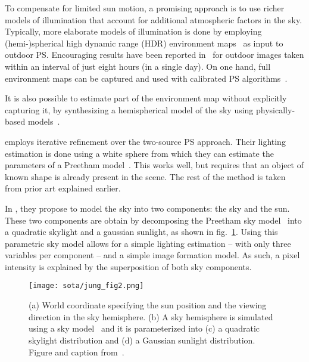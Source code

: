 To compensate for limited sun motion, a promising approach is to use richer models of illumination that account for additional atmospheric factors in the sky. Typically, more elaborate models of illumination is done by employing (hemi-)spherical high dynamic range (HDR) environment maps~\cite{debevec-siggraph-98,reinhard-book-05} as input to outdoor PS. Encouraging results have been reported in~\cite{yu-iccp-13} for outdoor images taken within an interval of just eight hours (in a single day). On one hand, full environment maps can be captured and used with calibrated PS algorithms~\cite{yu-iccp-13,shi-3dv-14,hung-wacv-15}.


It is also possible to estimate part of the environment map without explicitly capturing it, by synthesizing a hemispherical model of the sky using physically-based models~\cite{inose-tcva-13,jung-cvpr-15}.

\cite{inose-tcva-13} employs iterative refinement over the two-source PS approach. Their lighting estimation is done using a white sphere from which they can estimate the parameters of a Preetham model~\cite{preetham-siggraph-99}. This works well, but requires that an object of known shape is already present in the scene. The rest of the method is taken from prior art explained earlier.

In \cite{jung-cvpr-15}, they propose to model the sky into two components: the sky and the sun. These two components are obtain by decomposing the Preetham sky model~\cite{preetham-siggraph-99} into a quadratic skylight and a gaussian sunlight, as shown in fig.~\ref{fig:jung-skysim}. Using this parametric sky model allows for a simple lighting estimation -- with only three variables per component -- and a simple image formation model. As such, a pixel intensity is explained by the superposition of both sky components.

\begin{figure}
\centering
\texttt{[image: sota/jung\_fig2.png]}
\caption{(a) World coordinate specifying the sun position and the viewing direction in the sky hemisphere. (b) A sky hemisphere is simulated using a sky model~\cite{preetham-siggraph-99} and it is parameterized into (c) a quadratic skylight distribution and (d) a Gaussian sunlight distribution. Figure and caption from~\cite{jung-cvpr-15}.}
\label{fig:jung-skysim}
\end{figure}

